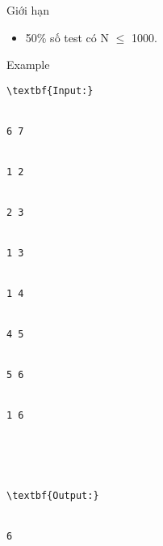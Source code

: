 Giới hạn
\begin{itemize}
	\item     50\% số test có N  $\le$  1000.   
\end{itemize}
Example
\begin{verbatim}
\textbf{Input:}


6 7


1 2


2 3


1 3


1 4


4 5


5 6


1 6





\textbf{Output:}


6\end{verbatim}